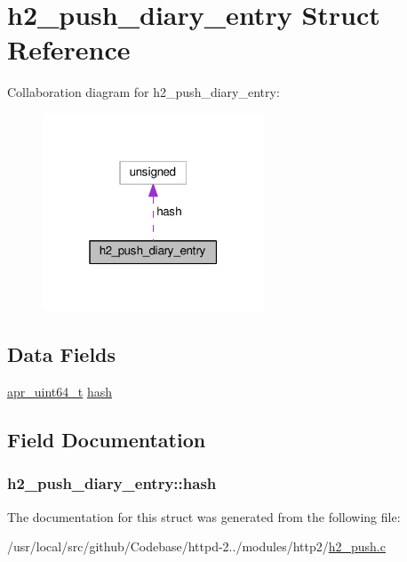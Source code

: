 \hypertarget{structh2__push__diary__entry}{}\section{h2\+\_\+push\+\_\+diary\+\_\+entry Struct Reference}
\label{structh2__push__diary__entry}


Collaboration diagram for h2\+\_\+push\+\_\+diary\+\_\+entry\+:
\nopagebreak
\begin{figure}[H]
\begin{center}
\leavevmode
\includegraphics[width=187pt]{structh2__push__diary__entry__coll__graph}
\end{center}
\end{figure}
\subsection*{Data Fields}
\begin{DoxyCompactItemize}
\item 
\hyperlink{group__apr__platform_ga722b277a42230f3fd41cb5be7a76cfb4}{apr\+\_\+uint64\+\_\+t} \hyperlink{structh2__push__diary__entry_a15a922d7c645ca9cd8ab590a8ac761e1}{hash}
\end{DoxyCompactItemize}


\subsection{Field Documentation}
\subsubsection[{\texorpdfstring{hash}{hash}}]{ h2\+\_\+push\+\_\+diary\+\_\+entry\+::hash}\hypertarget{structh2__push__diary__entry_a15a922d7c645ca9cd8ab590a8ac761e1}{}\label{structh2__push__diary__entry_a15a922d7c645ca9cd8ab590a8ac761e1}


The documentation for this struct was generated from the following file\+:\begin{DoxyCompactItemize}
\item 
/usr/local/src/github/\+Codebase/httpd-\/2../modules/http2/\hyperlink{h2__push_8c}{h2\+\_\+push.\+c}\end{DoxyCompactItemize}
